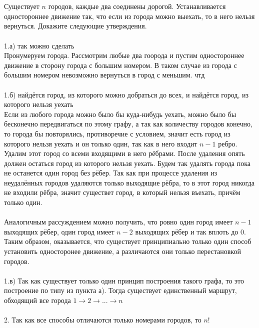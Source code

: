 \documentclass{article}
\begin{document}
\section{}
Существует $n$ городов, каждые два соединены дорогой. Устанавливается одностороннее движение так, что если из города можно выехать, то в него нельзя вернуться. Докажите следующие утверждения.\\\\
1.а) так можно сделать\\
Пронумеруем города. Рассмотрим любые два гоорода и пустим одностороннее движение в сторону города с большим номером. В таком случае из города с большим номером невозможно вернуться в город с меньшим. чтд\\\\
1.б) найдётся город, из которого можно добраться до всех, и найдётся город, из которого нельзя уехать\\
Если из любого города можно было бы куда-нибудь уехать, можно было бы бесконечно передвигаться по этому графу, а так как количеству городов конечно, то города бы повторялись, противоречие с условием, значит есть город из которого нельзя уехать и он только один, так как в него входит $n-1$ ребро. Удалим этот город со всеми входящими в него рёбрами. После удаления опять должен остаться город из которого нельзя уехать. Будем так удалять города пока не останется один город без рёбер. Так как при процессе удаления из неудалённых городов удаляются только выходящие рёбра, то в этот город никогда не входили рёбра, значит существет город, в который нельзя въехать, причём только один.
\\\\
Аналогичным рассуждением можно получить, что ровно один город имеет $n-1$ выходящих рёбер, один город имеет $n-2$ выходящих рёбер и так вплоть до 0. Таким образом, оказывается, что существует принципиально только один способ установить односторонее движение, а различаются они только перестановкой городов.
\\\\
1.в) Так как существует только один принцип построения такого графа, то это построение по типу из пункта а). Тогда существует единственный маршрут, обходящий все города $1\rightarrow2\rightarrow...\rightarrow n$\\\\
2. Так как все способы отличаются только номерами городов, то $n!$\\\\
\end{document}
